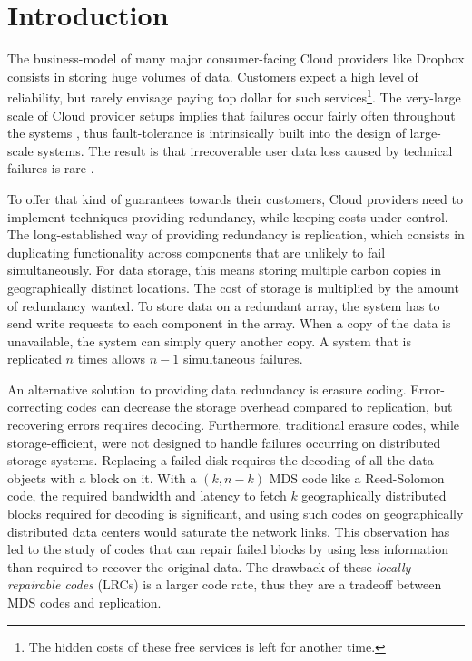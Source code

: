 \section{Introduction}
\label{sec:intro}

The business-model of many major consumer-facing Cloud providers like Dropbox consists in storing huge volumes of data. Customers expect a high level of reliability, but rarely envisage paying top dollar for such services\footnote{The hidden costs of these free services is left for another time.}. The very-large scale of Cloud provider setups implies that failures occur fairly often throughout the systems \autocite{failures-study}, thus fault-tolerance is intrinsically built into the design of large-scale systems. The result is that irrecoverable user data loss caused by technical failures is rare \autocite{racs}.

To offer that kind of guarantees towards their customers, Cloud providers need to implement techniques providing redundancy, while keeping costs under control. The long-established way of providing redundancy is replication, which consists in duplicating functionality across components that are unlikely to fail simultaneously. For data storage, this means storing multiple carbon copies in geographically distinct locations. The cost of storage is multiplied by the amount of redundancy wanted. To store data on a redundant array, the system has to send write requests to each component in the array. When a copy of the data is unavailable, the system can simply query another copy. A system that is replicated $n$ times allows $n-1$ simultaneous failures.

An alternative solution to providing data redundancy is erasure coding. Error-correcting codes can decrease the storage overhead compared to replication, but recovering errors requires decoding. Furthermore, traditional erasure codes, while storage-efficient, were not designed to handle failures occurring on distributed storage systems. Replacing a failed disk requires the decoding of all the data objects with a block on it. With a $(k,n-k)$ MDS code like a Reed-Solomon code, the required bandwidth and latency to fetch $k$ geographically distributed blocks required for decoding is significant, and using such codes on geographically distributed data centers would saturate the network links. This observation has led to the study of codes that can repair failed blocks by using less information than required to recover the original data. The drawback of these \emph{locally repairable codes} (LRCs) is a larger code rate, thus they are a tradeoff between MDS codes and replication.

